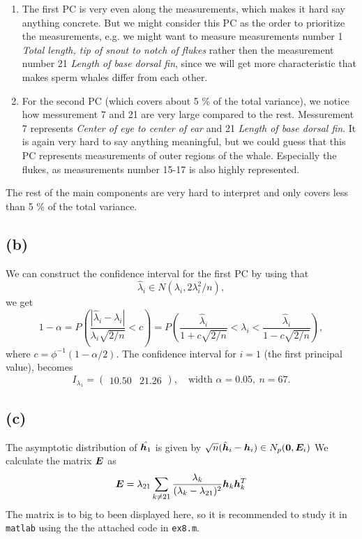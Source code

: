\begin{enumerate}
\item The first PC is very even along the measurements, which makes it
  hard say anything concrete. But we might consider this PC as the
  order to prioritize the measurements, e.g. we might want to measure
  measurements number 1 \textit{Total length, tip of snout to notch of
    flukes} rather then the measurement number 21 \textit{Length of base
    dorsal fin}, since we will get more characteristic that makes sperm
  whales differ from each other.
\item For the second PC (which  covers about 5 \% of the total variance), we notice how messurement 7 and 21 are very
  large compared to the rest. Messurement 7 represents \textit{Center of
    eye to center of ear} and 21 \textit{Length of base  dorsal fin}. It
  is again very hard to say anything meaningful, but we could guess that
  this PC represents measurements of outer regions of the
  whale. Especially the flukes, as measurements number 15-17 is also
  highly represented.
\end{enumerate}
The rest of the main components are very hard to interpret and only
covers less than 5 \% of the total variance.

\subsection*{(b)}
\label{sec:b-7}
 We can construct the confidence interval for the first PC by using
 that
 \begin{equation*}
   \hat\lambda_i \in N(\lambda_i, 2\lambda^2_i/n),
 \end{equation*}
we get
\begin{equation*}
 1- \alpha =  P\left(\frac{|\hat\lambda_i - \lambda_i|}{\lambda_i\sqrt{2/n}} < c\right) =
 P\left(\frac{\hat\lambda_i}{1 + c\sqrt{2/n}} < \lambda_{i} < \frac{\hat\lambda_i}{1 - c\sqrt{2/n}}\right),
\end{equation*}
where $c = \phi^{-1}(1 - \alpha/2)$. The confidence interval for $i =
1$ (the first principal value), becomes
\begin{equation*}
  I_{\lambda_{1}} =
  \begin{pmatrix}
    10.50 &21.26 
  \end{pmatrix}
, \quad \text{width }\alpha = 0.05,\ n = 67.
\end{equation*}

\subsection*{(c)}
\label{sec:c-7}
The asymptotic distribution of $ \hat{\bm{h}_1}$ is given by $\sqrt n
(\hat{\bm{h}}_i - \bm{h}_i) \in N_p(\bm{0}, \bm{E}_i)$
We calculate the matrix $\bm{E}$ as
\begin{equation*}
  \bm{E} = \lambda_{21} \sum_{k \neq 21}\frac{\lambda_k}{(\lambda_k -
    \lambda_{21})^2 }\bm{h}_k \bm{h}_k^T
\end{equation*}
The matrix is to big to been displayed here, so it is recommended to
study it in \texttt{matlab} using the the attached code in
\texttt{ex8.m}.

